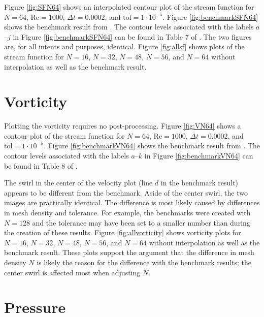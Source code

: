Figure \ref{fig:SFN64} shows an interpolated contour plot of the stream function for $N = 64$, $\text{Re} = 1000$, $\Delta t = 0.0002$, and $\text{tol} = 1 \cdot 10^{-5}$. Figure \ref{fig:benchmarkSFN64} shows the benchmark result from \parencite{botella1998benchmark}. The contour levels associated with the labels $a$--$j$ in Figure \ref{fig:benchmarkSFN64} can be found in Table 7 of \parencite{botella1998benchmark}. The two figures are, for all intents and purposes, identical. Figure \ref{fig:allsf} shows plots of the stream function for $N = 16$, $N = 32$, $N = 48$, $N = 56$, and $N = 64$ without interpolation as well as the benchmark result.

\section{Vorticity}

Plotting the vorticity requires no post-processing. Figure \ref{fig:VN64} shows a contour plot of the stream function for $N = 64$, $\text{Re} = 1000$, $\Delta t = 0.0002$, and $\text{tol} = 1 \cdot 10^{-5}$. Figure \ref{fig:benchmarkVN64} shows the benchmark result from \parencite{botella1998benchmark}. The contour levels associated with the labels $a$--$k$ in Figure \ref{fig:benchmarkVN64} can be found in Table 8 of \parencite{botella1998benchmark}.

The swirl in the center of the velocity plot (line $d$ in the benchmark result) appears to be different from the benchmark. Aside of the center swirl, the two images are practically identical. The difference is most likely caused by differences in mesh density and tolerance. For example, the benchmarks were created with $N = 128$ and the tolerance may have been set to a smaller number than during the creation of these results. Figure \ref{fig:allvorticity} shows vorticity plots for $N = 16$, $N = 32$, $N = 48$, $N = 56$, and $N = 64$ without interpolation as well as the benchmark result. These plots support the argument that the difference in mesh density $N$ is likely the reason for the difference with the benchmark results; the center swirl is affected most when adjusting $N$.

\section{Pressure}

